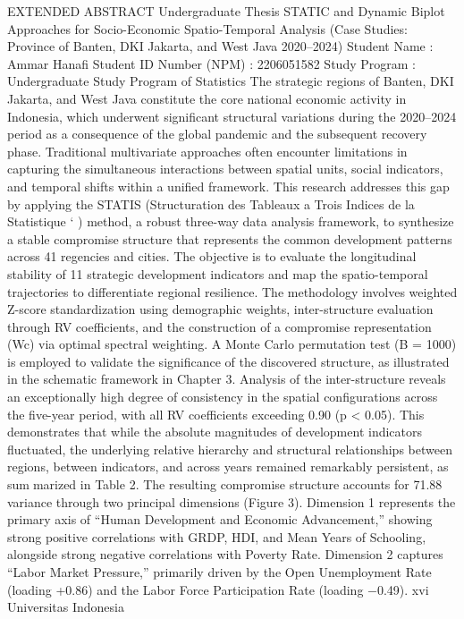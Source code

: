 EXTENDED ABSTRACT
Undergraduate Thesis
STATIC and Dynamic Biplot Approaches for Socio-Economic
Spatio-Temporal Analysis (Case Studies: Province of Banten, DKI
Jakarta, and West Java 2020–2024)
Student Name : Ammar Hanafi
Student ID Number (NPM) : 2206051582
Study Program : Undergraduate Study Program of Statistics
The strategic regions of Banten, DKI Jakarta, and West Java constitute the core national
economic activity in Indonesia, which underwent significant structural variations during the
2020–2024 period as a consequence of the global pandemic and the subsequent recovery
phase. Traditional multivariate approaches often encounter limitations in capturing the
simultaneous interactions between spatial units, social indicators, and temporal shifts
within a unified framework. This research addresses this gap by applying the STATIS
(Structuration des Tableaux a Trois Indices de la Statistique ` ) method, a robust three-way
data analysis framework, to synthesize a stable compromise structure that represents
the common development patterns across 41 regencies and cities. The objective is to
evaluate the longitudinal stability of 11 strategic development indicators and map the
spatio-temporal trajectories to differentiate regional resilience. The methodology involves
weighted Z-score standardization using demographic weights, inter-structure evaluation
through RV coefficients, and the construction of a compromise representation (Wc) via
optimal spectral weighting. A Monte Carlo permutation test (B = 1000) is employed
to validate the significance of the discovered structure, as illustrated in the schematic
framework in Chapter 3.
Analysis of the inter-structure reveals an exceptionally high degree of consistency in
the spatial configurations across the five-year period, with all RV coefficients exceeding
0.90 (p < 0.05). This demonstrates that while the absolute magnitudes of development
indicators fluctuated, the underlying relative hierarchy and structural relationships between
regions, between indicators, and across years remained remarkably persistent, as summarized in Table 2. The resulting compromise structure accounts for 71.88%
variance through two principal dimensions (Figure 3). Dimension 1 represents the primary
axis of “Human Development and Economic Advancement,” showing strong positive
correlations with GRDP, HDI, and Mean Years of Schooling, alongside strong negative
correlations with Poverty Rate. Dimension 2 captures “Labor Market Pressure,” primarily
driven by the Open Unemployment Rate (loading +0.86) and the Labor Force Participation
Rate (loading −0.49).
xvi Universitas Indonesia

